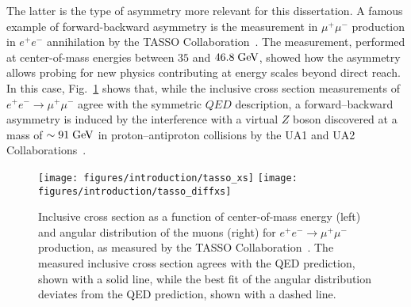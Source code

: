 The latter is the type of asymmetry more relevant for this
dissertation. A famous example of forward-backward asymmetry is the
measurement in $\mu^+\mu^-$ production in $e^+e^-$ annihilation by the
TASSO Collaboration~\cite{Braunschweig:1988fy}. The measurement,
performed at center-of-mass energies between $35$ and $46.8\; \mathrm{GeV}{}$,
showed how the asymmetry allows probing for new physics contributing at
energy scales beyond direct reach. In this case, Fig.~\ref{fig:tasso}
shows that, while the inclusive cross section measurements of
$e^+e^-\to\mu^+\mu^-$ agree with the symmetric $QED$ description, a
forward--backward asymmetry is induced by the interference with a
virtual $Z$ boson discovered at a mass of $\sim 91\; \mathrm{GeV}{}$ in
proton--antiproton collisions by the UA1 and UA2
Collaborations~\cite{Arnison:1983rp,Banner:1983jy}. 

\begin{figure}[!htb]\centering
  \texttt{[image: figures/introduction/tasso\_xs]}
  \texttt{[image: figures/introduction/tasso\_diffxs]}
  \caption{Inclusive cross section as a function of center-of-mass
    energy (left) and angular distribution of the muons (right) for
    $e^+e^-\to\mu^+\mu^-$ production, as measured by the TASSO
    Collaboration~\cite{Braunschweig:1988fy}. The measured inclusive cross
    section agrees with the QED prediction, shown with a solid line,
    while the best fit of the angular distribution deviates from the
    QED prediction, shown with a dashed line.} 
  \label{fig:tasso}
\end{figure}

